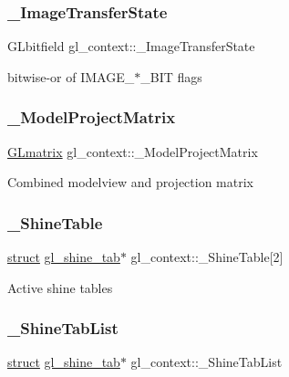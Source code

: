 \subsubsection{\texorpdfstring{\+\_\+\+Image\+Transfer\+State}{\_ImageTransferState}}
{\footnotesize\ttfamily G\+Lbitfield gl\+\_\+context\+::\+\_\+\+Image\+Transfer\+State}

bitwise-\/or of I\+M\+A\+G\+E\+\_\+$\ast$\+\_\+\+B\+IT flags \mbox{\label{structgl__context_a1dfc9b6e93931d47c5767c016dd099f1}} 
\subsubsection{\texorpdfstring{\+\_\+\+Model\+Project\+Matrix}{\_ModelProjectMatrix}}
{\footnotesize\ttfamily \hyperlink{struct_g_lmatrix}{G\+Lmatrix} gl\+\_\+context\+::\+\_\+\+Model\+Project\+Matrix}

Combined modelview and projection matrix \mbox{\label{structgl__context_a9e0baca009841a823b60862edbefc5ac}} 
\subsubsection{\texorpdfstring{\+\_\+\+Shine\+Table}{\_ShineTable}}
{\footnotesize\ttfamily \hyperlink{interfacestruct}{struct} \hyperlink{structgl__shine__tab}{gl\+\_\+shine\+\_\+tab}$\ast$ gl\+\_\+context\+::\+\_\+\+Shine\+Table\mbox{[}2\mbox{]}}

Active shine tables \mbox{\label{structgl__context_abe2ee6aaa885199a12ebdb6135e8045c}} 
\subsubsection{\texorpdfstring{\+\_\+\+Shine\+Tab\+List}{\_ShineTabList}}
{\footnotesize\ttfamily \hyperlink{interfacestruct}{struct} \hyperlink{structgl__shine__tab}{gl\+\_\+shine\+\_\+tab}$\ast$ gl\+\_\+context\+::\+\_\+\+Shine\+Tab\+List}

